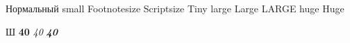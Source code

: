 \documentclass{article}
\begin{document}
	\papergraduate
	
	\normalsize Нормальный	
	\small small
	\footnotesize Footnotesize	
	\scriptsize Scriptsize
	\tiny Tiny	
	\large large	
	\Large Large	
	\LARGE LARGE	
	\huge huge	
	\Huge Huge
	
	\fontsize{40mm}{68mm} Ш
	\textbf{40}
	\textsl{40}
	\textbf{\slshape 40}
	
\end{document}
